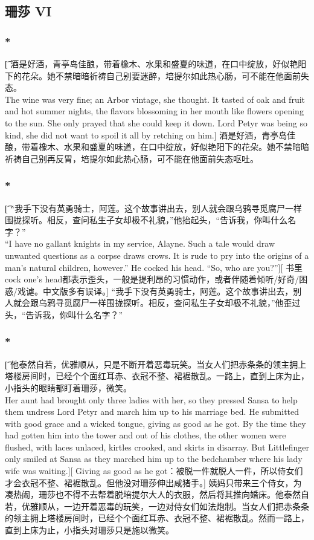 \documentclass[12pt,a4paper]{article}
\begin{document}
\subsection{珊莎 VI}
\subsubsection{\color{red}*}\t[
	酒是好酒，青亭岛佳酿，带着橡木、水果和盛夏的味道，在口中绽放，好似艳阳下的花朵。她不禁暗暗祈祷自己别要迷醉，培提尔如此热心肠，可不能在他面前失态。\\
	The wine was very fine; an Arbor vintage, she thought. It tasted of oak and fruit and hot summer nights, the flavors blossoming in her mouth like flowers opening to the sun. She only prayed that she could keep it down. Lord Petyr was being so kind, she did not want to spoil it all by retching on him.]
	酒是好酒，青亭岛佳酿，带着橡木、水果和盛夏的味道，在口中绽放，好似艳阳下的花朵。她不禁暗暗祈祷自己别再反胃，培提尔如此热心肠，可不能在他面前失态呕吐。
	
\subsubsection{\color{red}*}\t[	
	“我手下没有英勇骑士，阿莲。这个故事讲出去，别人就会跟乌鸦寻觅腐尸一样围拢探听。相反，查问私生子女却极不礼貌，”他抬起头，“告诉我，你叫什么名字？”\\
	“I have no gallant knights in my service, Alayne. Such a tale would draw unwanted questions as a corpse draws crows. It is rude to pry into the origins of a man's natural children, however.” He cocked his head. “So, who are you?”][
	书里cock one's head都表示歪头，一般是提利昂的习惯动作，或者伴随着倾听/好奇/困惑/戏谑。中文版多有误译。]
	“我手下没有英勇骑士，阿莲。这个故事讲出去，别人就会跟乌鸦寻觅腐尸一样围拢探听。相反，查问私生子女却极不礼貌，”他歪过头，“告诉我，你叫什么名字？”
	
\subsubsection{\color{red}*}\t[
	他泰然自若，优雅顺从，只是不断开着恶毒玩笑。当女人们把赤条条的领主拥上塔楼房间时，已经个个面红耳赤、衣冠不整、裙裾散乱。一路上，直到上床为止，小指头的眼睛都盯着珊莎，微笑。\\
	Her aunt had brought only three ladies with her, so they pressed Sansa to help them undress Lord Petyr and march him up to his marriage bed. He submitted with good grace and a wicked tongue, giving as good as he got. By the time they had gotten him into the tower and out of his clothes, the other women were flushed, with laces unlaced, kirtles crooked, and skirts in disarray. But Littlefinger only smiled at Sansa as they marched him up to the bedchamber where his lady wife was waiting.][
	Giving as good as he got：被脱一件就脱人一件，所以侍女们才会衣冠不整、裙裾散乱。但他没对珊莎伸出咸猪手。]
	姨妈只带来三个侍女，为凑热闹，珊莎也不得不去帮着脱培提尔大人的衣服，然后将其推向婚床。他泰然自若，优雅顺从，一边开着恶毒的玩笑，一边对侍女们如法炮制。当女人们把赤条条的领主拥上塔楼房间时，已经个个面红耳赤、衣冠不整、裙裾散乱。然而一路上，直到上床为止，小指头对珊莎只是施以微笑。
	
\end{document}
